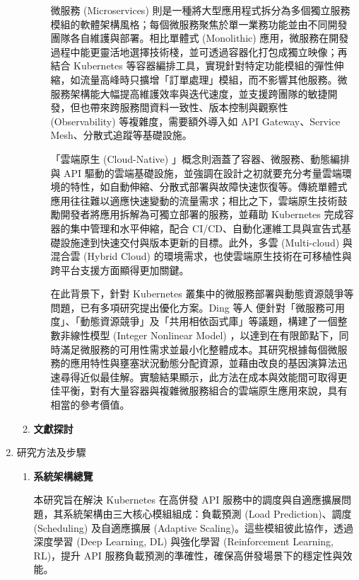\documentclass[12pt,a4paper]{article}
\begin{document}
\begin{enumerate}[label={(\zhdig*)}, leftmargin=2\parindent, listparindent=\parindent]
\begin{enumerate}[label={(\arabic*)}, leftmargin=\parindent, listparindent=\parindent]
\begin{enumerate}[label={(\zhdig*)}, leftmargin=2\parindent, listparindent=\parindent]
微服務 (Microservices) 則是一種將大型應用程式拆分為多個獨立服務模組的軟體架構風格；每個微服務聚焦於單一業務功能並由不同開發團隊各自維護與部署。相比單體式 (Monolithic) 應用，微服務在開發過程中能更靈活地選擇技術棧，並可透過容器化打包成獨立映像；再結合 Kubernetes 等容器編排工具，實現針對特定功能模組的彈性伸縮，如流量高峰時只擴增「訂單處理」模組，而不影響其他服務。微服務架構能大幅提高維護效率與迭代速度，並支援跨團隊的敏捷開發，但也帶來跨服務間資料一致性、版本控制與觀察性 (Observability) 等複雜度，需要額外導入如 API Gateway、Service Mesh、分散式追蹤等基礎設施。

「雲端原生 (Cloud-Native) 」概念則涵蓋了容器、微服務、動態編排與 API 驅動的雲端基礎設施，並強調在設計之初就要充分考量雲端環境的特性，如自動伸縮、分散式部署與故障快速恢復等。傳統單體式應用往往難以適應快速變動的流量需求；相比之下，雲端原生技術鼓勵開發者將應用拆解為可獨立部署的服務，並藉助 Kubernetes 完成容器的集中管理和水平伸縮，配合 CI/CD、自動化運維工具與宣告式基礎設施達到快速交付與版本更新的目標。此外，多雲 (Multi-cloud) 與混合雲 (Hybrid Cloud) 的環境需求，也使雲端原生技術在可移植性與跨平台支援方面顯得更加關鍵。

在此背景下，針對 Kubernetes 叢集中的微服務部署與動態資源競爭等問題，已有多項研究提出優化方案。Ding 等人\cite{21} 便針對「微服務可用度」、「動態資源競爭」及「共用相依函式庫」等議題，構建了一個整數非線性模型 (Integer Nonlinear Model) ，以達到在有限節點下，同時滿足微服務的可用性需求並最小化整體成本。其研究根據每個微服務的應用特性與壅塞狀況動態分配資源，並藉由改良的基因演算法迅速尋得近似最佳解。實驗結果顯示，此方法在成本與效能間可取得更佳平衡，對有大量容器與複雜微服務組合的雲端原生應用來說，具有相當的參考價值。

\end{enumerate}

\item \textbf{文獻探討}

\end{enumerate}
\item 研究方法及步驟
\begin{enumerate}[label={(\arabic*)}, leftmargin=\parindent, listparindent=\parindent]

\item \textbf{
系統架構總覽
}

本研究旨在解決 Kubernetes 在高併發 API 服務中的調度與自適應擴展問題，其系統架構由三大核心模組組成：負載預測 (Load Prediction)、調度 (Scheduling) 及自適應擴展 (Adaptive Scaling)。這些模組彼此協作，透過 深度學習 (Deep Learning, DL) 與強化學習 (Reinforcement Learning, RL)，提升 API 服務負載預測的準確性，確保高併發場景下的穩定性與效能。


\end{enumerate}
\end{enumerate}
\end{document}
